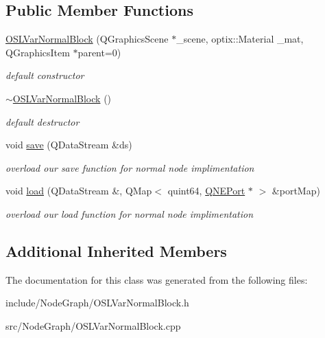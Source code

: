 \subsection*{Public Member Functions}
\begin{DoxyCompactItemize}
\item 
\hypertarget{class_o_s_l_var_normal_block_a2a8b40300400ae29bd3983224bac8efb}{\hyperlink{class_o_s_l_var_normal_block_a2a8b40300400ae29bd3983224bac8efb}{O\-S\-L\-Var\-Normal\-Block} (Q\-Graphics\-Scene $\ast$\-\_\-scene, optix\-::\-Material \-\_\-mat, Q\-Graphics\-Item $\ast$parent=0)}\label{class_o_s_l_var_normal_block_a2a8b40300400ae29bd3983224bac8efb}

\begin{DoxyCompactList}\small\item\em default constructor \end{DoxyCompactList}\item 
\hypertarget{class_o_s_l_var_normal_block_a44edf4f31a638a64bd4b82c2616bb6e2}{\hyperlink{class_o_s_l_var_normal_block_a44edf4f31a638a64bd4b82c2616bb6e2}{$\sim$\-O\-S\-L\-Var\-Normal\-Block} ()}\label{class_o_s_l_var_normal_block_a44edf4f31a638a64bd4b82c2616bb6e2}

\begin{DoxyCompactList}\small\item\em default destructor \end{DoxyCompactList}\item 
\hypertarget{class_o_s_l_var_normal_block_a64f4ce8e0da75c1442600d8f7d693e58}{void \hyperlink{class_o_s_l_var_normal_block_a64f4ce8e0da75c1442600d8f7d693e58}{save} (Q\-Data\-Stream \&ds)}\label{class_o_s_l_var_normal_block_a64f4ce8e0da75c1442600d8f7d693e58}

\begin{DoxyCompactList}\small\item\em overload our save function for normal node implimentation \end{DoxyCompactList}\item 
\hypertarget{class_o_s_l_var_normal_block_a405ced7c8d4102426b41fac53e552771}{void \hyperlink{class_o_s_l_var_normal_block_a405ced7c8d4102426b41fac53e552771}{load} (Q\-Data\-Stream \&, Q\-Map$<$ quint64, \hyperlink{class_q_n_e_port}{Q\-N\-E\-Port} $\ast$ $>$ \&port\-Map)}\label{class_o_s_l_var_normal_block_a405ced7c8d4102426b41fac53e552771}

\begin{DoxyCompactList}\small\item\em overload our load function for normal node implimentation \end{DoxyCompactList}\end{DoxyCompactItemize}
\subsection*{Additional Inherited Members}


The documentation for this class was generated from the following files\-:\begin{DoxyCompactItemize}
\item 
include/\-Node\-Graph/O\-S\-L\-Var\-Normal\-Block.\-h\item 
src/\-Node\-Graph/O\-S\-L\-Var\-Normal\-Block.\-cpp\end{DoxyCompactItemize}
